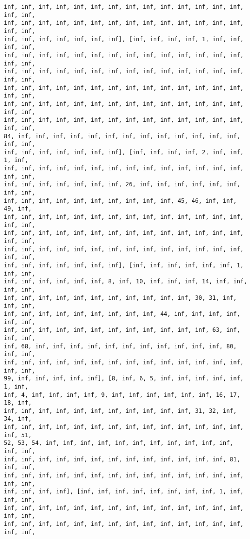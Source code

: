 \documentclass[11pt]{article}
\begin{document}
\begin{Verbatim}[commandchars=\\\{\}]
inf, inf, inf, inf, inf, inf, inf, inf, inf, inf, inf, inf, inf, inf, inf, inf,
inf, inf, inf, inf, inf, inf, inf, inf, inf, inf, inf, inf, inf, inf, inf, inf,
inf, inf, inf, inf, inf, inf, inf], [inf, inf, inf, inf, 1, inf, inf, inf, inf,
inf, inf, inf, inf, inf, inf, inf, inf, inf, inf, inf, inf, inf, inf, inf, inf,
inf, inf, inf, inf, inf, inf, inf, inf, inf, inf, inf, inf, inf, inf, inf, inf,
inf, inf, inf, inf, inf, inf, inf, inf, inf, inf, inf, inf, inf, inf, inf, inf,
inf, inf, inf, inf, inf, inf, inf, inf, inf, inf, inf, inf, inf, inf, inf, inf,
inf, inf, inf, inf, inf, inf, inf, inf, inf, inf, inf, inf, inf, inf, inf, inf,
84, inf, inf, inf, inf, inf, inf, inf, inf, inf, inf, inf, inf, inf, inf, inf,
inf, inf, inf, inf, inf, inf, inf], [inf, inf, inf, inf, 2, inf, inf, 1, inf,
inf, inf, inf, inf, inf, inf, inf, inf, inf, inf, inf, inf, inf, inf, inf, inf,
inf, inf, inf, inf, inf, inf, inf, 26, inf, inf, inf, inf, inf, inf, inf, inf,
inf, inf, inf, inf, inf, inf, inf, inf, inf, inf, 45, 46, inf, inf, 49, inf,
inf, inf, inf, inf, inf, inf, inf, inf, inf, inf, inf, inf, inf, inf, inf, inf,
inf, inf, inf, inf, inf, inf, inf, inf, inf, inf, inf, inf, inf, inf, inf, inf,
inf, inf, inf, inf, inf, inf, inf, inf, inf, inf, inf, inf, inf, inf, inf, inf,
inf, inf, inf, inf, inf, inf, inf], [inf, inf, inf, inf, inf, inf, 1, inf, inf,
inf, inf, inf, inf, inf, inf, 8, inf, 10, inf, inf, inf, 14, inf, inf, inf, inf,
inf, inf, inf, inf, inf, inf, inf, inf, inf, inf, inf, 30, 31, inf, inf, inf,
inf, inf, inf, inf, inf, inf, inf, inf, inf, 44, inf, inf, inf, inf, inf, inf,
inf, inf, inf, inf, inf, inf, inf, inf, inf, inf, inf, inf, 63, inf, inf, inf,
inf, 68, inf, inf, inf, inf, inf, inf, inf, inf, inf, inf, inf, 80, inf, inf,
inf, inf, inf, inf, inf, inf, inf, inf, inf, inf, inf, inf, inf, inf, inf, inf,
99, inf, inf, inf, inf, inf], [8, inf, 6, 5, inf, inf, inf, inf, inf, 1, inf,
inf, 4, inf, inf, inf, inf, 9, inf, inf, inf, inf, inf, inf, 16, 17, 18, inf,
inf, inf, inf, inf, inf, inf, inf, inf, inf, inf, inf, 31, 32, inf, 34, inf,
inf, inf, inf, inf, inf, inf, inf, inf, inf, inf, inf, inf, inf, inf, inf, 51,
52, 53, 54, inf, inf, inf, inf, inf, inf, inf, inf, inf, inf, inf, inf, inf,
inf, inf, inf, inf, inf, inf, inf, inf, inf, inf, inf, inf, inf, 81, inf, inf,
inf, inf, inf, inf, inf, inf, inf, inf, inf, inf, inf, inf, inf, inf, inf, inf,
inf, inf, inf, inf], [inf, inf, inf, inf, inf, inf, inf, inf, 1, inf, inf, inf,
inf, inf, inf, inf, inf, inf, inf, inf, inf, inf, inf, inf, inf, inf, inf, inf,
inf, inf, inf, inf, inf, inf, inf, inf, inf, inf, inf, inf, inf, inf, inf, inf,

\end{Verbatim}
\end{document}
